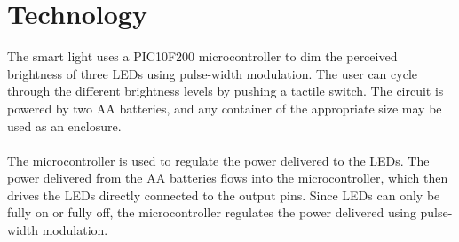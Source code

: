 \documentclass[11pt, twocolumn]{article}
\begin{document}
\section*{Technology}
The smart light uses a PIC10F200 microcontroller to dim the perceived brightness of three LEDs using pulse-width modulation. The user can cycle through the different brightness levels by pushing a tactile switch. The circuit is powered by two AA batteries, and any container of the appropriate size may be used as an enclosure.\ \\
\ \\
The microcontroller is used to regulate the power delivered to the LEDs. The power delivered from the AA batteries flows into the microcontroller, which then drives the LEDs directly connected to the output pins. Since LEDs can only be fully on or fully off, the microcontroller regulates the power delivered using pulse-width modulation.
\end{document}
